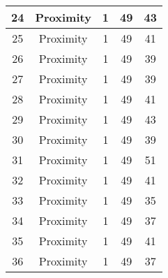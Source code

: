 \documentclass[results.tex]{subfiles}
\begin{document}
\begin{center}
\begin{tabular}{| c || c | c | c | c |}
            \hline
            24                      & Proximity                    & 1                      & 49                      & 43                   \\
            \hline
            25                      & Proximity                    & 1                      & 49                      & 41                   \\
            \hline
            26                      & Proximity                    & 1                      & 49                      & 39                   \\
            \hline
            27                      & Proximity                    & 1                      & 49                      & 39                   \\
            \hline
            28                      & Proximity                    & 1                      & 49                      & 41                   \\
            \hline
            29                      & Proximity                    & 1                      & 49                      & 43                   \\
            \hline
            30                      & Proximity                    & 1                      & 49                      & 39                   \\
            \hline
            31                      & Proximity                    & 1                      & 49                      & 51                   \\
            \hline
            32                      & Proximity                    & 1                      & 49                      & 41                   \\
            \hline
            33                      & Proximity                    & 1                      & 49                      & 35                   \\
            \hline
            34                      & Proximity                    & 1                      & 49                      & 37                   \\
            \hline
            35                      & Proximity                    & 1                      & 49                      & 41                   \\
            \hline
            36                      & Proximity                    & 1                      & 49                      & 37                   \\

\end{tabular}
\end{center}
\end{document}
